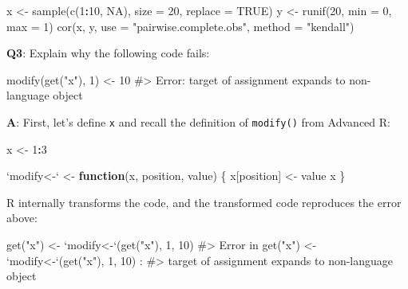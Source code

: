 \documentclass[
]{krantz}
\makeatletter
\newenvironment{Shaded}{\begin{snugshade}}{\end{snugshade}}
\newcommand{\CommentTok}[1]{\textcolor[rgb]{0.56,0.35,0.01}{\textit{#1}}}
\newcommand{\ControlFlowTok}[1]{\textcolor[rgb]{0.13,0.29,0.53}{\textbf{#1}}}
\newcommand{\DataTypeTok}[1]{\textcolor[rgb]{0.13,0.29,0.53}{#1}}
\newcommand{\DecValTok}[1]{\textcolor[rgb]{0.00,0.00,0.81}{#1}}
\newcommand{\KeywordTok}[1]{\textcolor[rgb]{0.13,0.29,0.53}{\textbf{#1}}}
\newcommand{\NormalTok}[1]{#1}
\newcommand{\OperatorTok}[1]{\textcolor[rgb]{0.81,0.36,0.00}{\textbf{#1}}}
\newcommand{\OtherTok}[1]{\textcolor[rgb]{0.56,0.35,0.01}{#1}}
\newcommand{\StringTok}[1]{\textcolor[rgb]{0.31,0.60,0.02}{#1}}
\newenvironment{kframe}{%
\medskip{}
\setlength{\fboxsep}{.8em}
 \def\at@end@of@kframe{}%
 \ifinner\ifhmode%
  \def\at@end@of@kframe{\end{minipage}}%
  \begin{minipage}{\columnwidth}%
 \fi\fi%
 \def\FrameCommand##1{\hskip\@totalleftmargin \hskip-\fboxsep
 \colorbox{shadecolor}{##1}\hskip-\fboxsep
     \hskip-\linewidth \hskip-\@totalleftmargin \hskip\columnwidth}%
 \MakeFramed {\advance\hsize-\width
   \@totalleftmargin\z@ \linewidth\hsize
   \@setminipage}}%
 {\par\unskip\endMakeFramed%
 \at@end@of@kframe}
\renewenvironment{Shaded}{\begin{kframe}}{\end{kframe}}
\renewcommand{\KeywordTok} [1]{\textcolor[rgb]{0.00,0.44,0.13}{{#1}}}
\renewcommand{\DataTypeTok}[1]{\textcolor[rgb]{0.56,0.13,0.00}{{#1}}}
\renewcommand{\DecValTok}  [1]{\textcolor[rgb]{0.25,0.63,0.44}{{#1}}}
\renewcommand{\StringTok}  [1]{\textcolor[rgb]{0.25,0.44,0.63}{{#1}}}
\renewcommand{\CommentTok} [1]{\textcolor[rgb]{0.38,0.63,0.69}{{#1}}}
\renewcommand{\OtherTok}   [1]{\textcolor[rgb]{0.00,0.44,0.13}{{#1}}}
\renewcommand{\NormalTok}  [1]{{#1}}
\makeatother
\begin{document}
\begin{Shaded}
\begin{Highlighting}[]
\NormalTok{x <-}\StringTok{ }\KeywordTok{sample}\NormalTok{(}\KeywordTok{c}\NormalTok{(}\DecValTok{1}\OperatorTok{:}\DecValTok{10}\NormalTok{, }\OtherTok{NA}\NormalTok{), }\DataTypeTok{size =} \DecValTok{20}\NormalTok{, }\DataTypeTok{replace =} \OtherTok{TRUE}\NormalTok{)}
\NormalTok{y <-}\StringTok{ }\KeywordTok{runif}\NormalTok{(}\DecValTok{20}\NormalTok{, }\DataTypeTok{min =} \DecValTok{0}\NormalTok{, }\DataTypeTok{max =} \DecValTok{1}\NormalTok{)}
\KeywordTok{cor}\NormalTok{(x, y, }\DataTypeTok{use =} \StringTok{"pairwise.complete.obs"}\NormalTok{, }\DataTypeTok{method =} \StringTok{"kendall"}\NormalTok{)}
\end{Highlighting}
\end{Shaded}

\textbf{{Q3}}: Explain why the following code fails:

\begin{Shaded}
\begin{Highlighting}[]
\KeywordTok{modify}\NormalTok{(}\KeywordTok{get}\NormalTok{(}\StringTok{"x"}\NormalTok{), }\DecValTok{1}\NormalTok{) <-}\StringTok{ }\DecValTok{10}
\CommentTok{#> Error: target of assignment expands to non-language object}
\end{Highlighting}
\end{Shaded}

\textbf{{A}}: First, let's define \texttt{x} and recall the definition of \texttt{modify()} from Advanced R:

\begin{Shaded}
\begin{Highlighting}[]
\NormalTok{x <-}\StringTok{ }\DecValTok{1}\OperatorTok{:}\DecValTok{3}

\StringTok{`}\DataTypeTok{modify<-}\StringTok{`}\NormalTok{ <-}\StringTok{ }\ControlFlowTok{function}\NormalTok{(x, position, value) \{}
\NormalTok{  x[position] <-}\StringTok{ }\NormalTok{value}
\NormalTok{  x}
\NormalTok{\}}
\end{Highlighting}
\end{Shaded}

R internally transforms the code, and the transformed code reproduces the error above:

\begin{Shaded}
\begin{Highlighting}[]
\KeywordTok{get}\NormalTok{(}\StringTok{"x"}\NormalTok{) <-}\StringTok{ `}\DataTypeTok{modify<-}\StringTok{`}\NormalTok{(}\KeywordTok{get}\NormalTok{(}\StringTok{"x"}\NormalTok{), }\DecValTok{1}\NormalTok{, }\DecValTok{10}\NormalTok{)}
\CommentTok{#> Error in get("x") <- `modify<-`(get("x"), 1, 10) : }
\CommentTok{#>   target of assignment expands to non-language object}
\end{Highlighting}
\end{Shaded}
\end{document}
